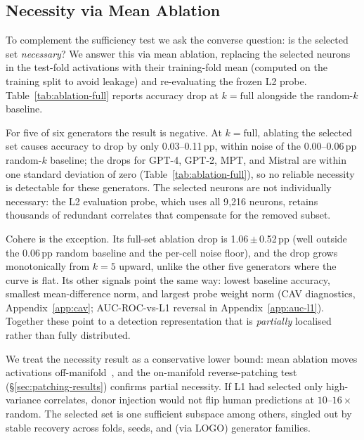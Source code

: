 \documentclass[11pt]{article}
\begin{document}
\subsection{Necessity via Mean Ablation}
\label{sec:results-necessity}

To complement the sufficiency test we ask the converse question: is the selected set \textit{necessary}? We answer this via mean ablation, replacing the selected neurons in the test-fold activations with their training-fold mean (computed on the training split to avoid leakage) and re-evaluating the frozen L2 probe. Table~\ref{tab:ablation-full} reports accuracy drop at $k = \text{full}$ alongside the random-$k$ baseline.

For five of six generators the result is negative. At $k = \text{full}$, ablating the selected set causes accuracy to drop by only 0.03--0.11\,pp, within noise of the 0.00--0.06\,pp random-$k$ baseline; the drops for GPT-4, GPT-2, MPT, and Mistral are within one standard deviation of zero (Table~\ref{tab:ablation-full}), so no reliable necessity is detectable for these generators. The selected neurons are not individually necessary: the L2 evaluation probe, which uses all 9{,}216 neurons, retains thousands of redundant correlates that compensate for the removed subset.

Cohere is the exception. Its full-set ablation drop is 1.06\,$\pm$\,0.52\,pp (well outside the 0.06\,pp random baseline and the per-cell noise floor), and the drop grows monotonically from $k = 5$ upward, unlike the other five generators where the curve is flat. Its other signals point the same way: lowest baseline accuracy, smallest mean-difference norm, and largest probe weight norm (CAV diagnostics, Appendix~\ref{app:cav}; AUC-ROC-vs-L1 reversal in Appendix~\ref{app:auc-l1}). Together these point to a detection representation that is \textit{partially} localised rather than fully distributed.

We treat the necessity result as a conservative lower bound: mean ablation moves activations off-manifold~\citep{heimersheim2024patching}, and the on-manifold reverse-patching test (§\ref{sec:patching-results}) confirms partial necessity. If L1 had selected only high-variance correlates, donor injection would not flip human predictions at $10\text{--}16\times$ random. The selected set is one sufficient subspace among others, singled out by stable recovery across folds, seeds, and (via LOGO) generator families.
\end{document}
